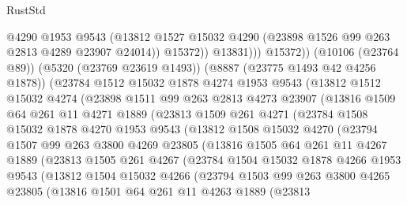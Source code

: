 \begin{lexlean}{RustStd}
\begin{coremodule}
                    @4290
                    @1953
                    @9543
                    (@13812 @1527 @15032 @4290 (@23898 @1526 @99 @263 @2813 @4289 @23907 @24014))
                    @15372))
                @13831)))
          @15372))
      (@10106 (@23764 @89))
      (@5320 (@23769 @23619 @1493))
      (@8887 (@23775 @1493 @42 @4256 @1878))
      (@23784
        @1512
        @15032
        @1878
        @4274
        @1953
        @9543
        (@13812
          @1512
          @15032
          @4274
          (@23898
            @1511
            @99
            @263
            @2813
            @4273
            @23907
            (@13816
              @1509
              @64
              @261
              @11
              @4271
              @1889
              (@23813
                @1509
                @261
                @4271
                (@23784
                  @1508
                  @15032
                  @1878
                  @4270
                  @1953
                  @9543
                  (@13812
                    @1508
                    @15032
                    @4270
                    (@23794
                      @1507
                      @99
                      @263
                      @3800
                      @4269
                      @23805
                      (@13816
                        @1505
                        @64
                        @261
                        @11
                        @4267
                        @1889
                        (@23813
                          @1505
                          @261
                          @4267
                          (@23784
                            @1504
                            @15032
                            @1878
                            @4266
                            @1953
                            @9543
                            (@13812
                              @1504
                              @15032
                              @4266
                              (@23794
                                @1503
                                @99
                                @263
                                @3800
                                @4265
                                @23805
                                (@13816
                                  @1501
                                  @64
                                  @261
                                  @11
                                  @4263
                                  @1889
                                  (@23813

\end{coremodule}
\end{lexlean}

